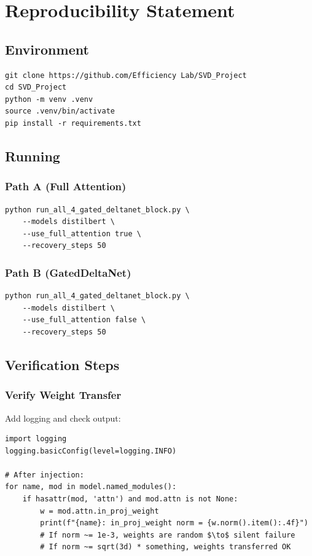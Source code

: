 
\section{Reproducibility Statement}

\subsection{Environment}

\begin{lstlisting}
git clone https://github.com/Efficiency Lab/SVD_Project
cd SVD_Project
python -m venv .venv
source .venv/bin/activate
pip install -r requirements.txt
\end{lstlisting}

\subsection{Running}

\subsubsection{Path A (Full Attention)}

\begin{lstlisting}
python run_all_4_gated_deltanet_block.py \
    --models distilbert \
    --use_full_attention true \
    --recovery_steps 50
\end{lstlisting}

\subsubsection{Path B (GatedDeltaNet)}

\begin{lstlisting}
python run_all_4_gated_deltanet_block.py \
    --models distilbert \
    --use_full_attention false \
    --recovery_steps 50
\end{lstlisting}

\subsection{Verification Steps}

\subsubsection{Verify Weight Transfer}

Add logging and check output:

\begin{lstlisting}
import logging
logging.basicConfig(level=logging.INFO)

# After injection:
for name, mod in model.named_modules():
    if hasattr(mod, 'attn') and mod.attn is not None:
        w = mod.attn.in_proj_weight
        print(f"{name}: in_proj_weight norm = {w.norm().item():.4f}")
        # If norm ~= 1e-3, weights are random $\to$ silent failure
        # If norm ~= sqrt(3d) * something, weights transferred OK
\end{lstlisting}

